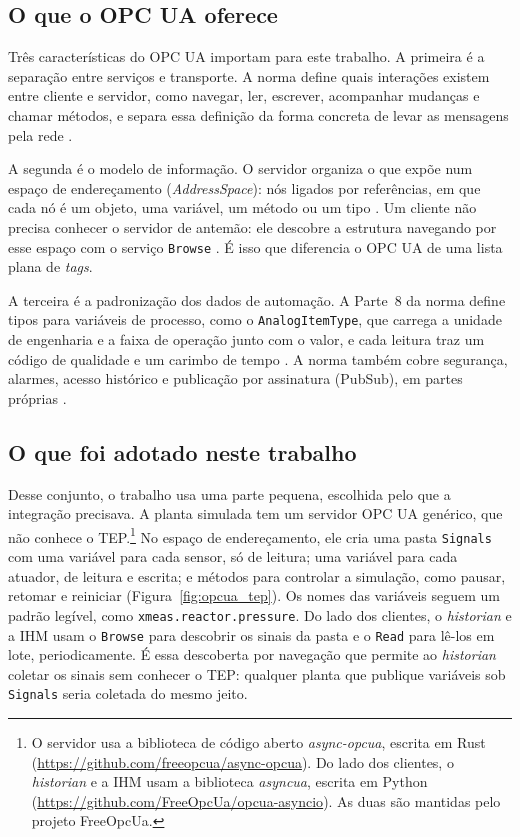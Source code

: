 \subsection{O que o OPC UA oferece}

Três características do OPC UA importam para este trabalho. A primeira é a separação entre serviços e transporte. A norma define quais interações existem entre cliente e servidor, como navegar, ler, escrever, acompanhar mudanças e chamar métodos, e separa essa definição da forma concreta de levar as mensagens pela rede \cite{Mahnke2009services}.

A segunda é o modelo de informação. O servidor organiza o que expõe num espaço de endereçamento (\textit{AddressSpace}): nós ligados por referências, em que cada nó é um objeto, uma variável, um método ou um tipo \cite{IEC62541_3}. Um cliente não precisa conhecer o servidor de antemão: ele descobre a estrutura navegando por esse espaço com o serviço \texttt{Browse} \cite{Mahnke2009services}. É isso que diferencia o OPC UA de uma lista plana de \textit{tags}.

A terceira é a padronização dos dados de automação. A Parte~8 da norma define tipos para variáveis de processo, como o \texttt{AnalogItemType}, que carrega a unidade de engenharia e a faixa de operação junto com o valor, e cada leitura traz um código de qualidade e um carimbo de tempo \cite{IEC62541_8}. A norma também cobre segurança, alarmes, acesso histórico e publicação por assinatura (PubSub), em partes próprias \cite{IEC62541_1}.

\subsection{O que foi adotado neste trabalho}

Desse conjunto, o trabalho usa uma parte pequena, escolhida pelo que a integração precisava. A planta simulada tem um servidor OPC UA genérico, que não conhece o TEP.\footnote{O servidor usa a biblioteca de código aberto \textit{async-opcua}, escrita em Rust (\url{https://github.com/freeopcua/async-opcua}). Do lado dos clientes, o \textit{historian} e a IHM usam a biblioteca \textit{asyncua}, escrita em Python (\url{https://github.com/FreeOpcUa/opcua-asyncio}). As duas são mantidas pelo projeto FreeOpcUa.} No espaço de endereçamento, ele cria uma pasta \texttt{Signals} com uma variável para cada sensor, só de leitura; uma variável para cada atuador, de leitura e escrita; e métodos para controlar a simulação, como pausar, retomar e reiniciar (Figura~\ref{fig:opcua_tep}). Os nomes das variáveis seguem um padrão legível, como \texttt{xmeas.reactor.pressure}. Do lado dos clientes, o \textit{historian} e a IHM usam o \texttt{Browse} para descobrir os sinais da pasta e o \texttt{Read} para lê-los em lote, periodicamente. É essa descoberta por navegação que permite ao \textit{historian} coletar os sinais sem conhecer o TEP: qualquer planta que publique variáveis sob \texttt{Signals} seria coletada do mesmo jeito.

